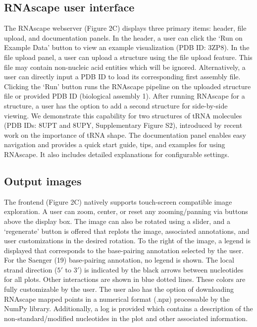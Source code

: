 \subsection{RNAscape user interface}

The RNAscape webserver (Figure 2C) displays three primary items: header, file upload, and documentation panels. In the header, a user can click the ‘Run on Example Data’ button to view an example visualization (PDB ID: 3ZP8). In the file upload panel, a user can upload a structure using the file upload feature. This file may contain non-nucleic acid entities which will be ignored. Alternatively, a user can directly input a PDB ID to load its corresponding first assembly file. Clicking the ‘Run’ button runs the RNAscape pipeline on the uploaded structure file or provided PDB ID (biological assembly 1). After running RNAscape for a structure, a user has the option to add a second structure for side-by-side viewing. We demonstrate this capability for two structures of tRNA molecules (PDB IDs: 8UPT and 8UPY, Supplementary Figure S2), introduced by recent work \citep{Krahn2024} on the importance of tRNA shape. The documentation panel enables easy navigation and provides a quick start guide, tips, and examples for using RNAscape. It also includes detailed explanations for configurable settings.

\subsection{Output images}

The frontend (Figure 2C) natively supports touch-screen compatible image exploration. A user can zoom, center, or reset any zooming/panning via buttons above the display box. The image can also be rotated using a slider, and a ‘regenerate’ button is offered that replots the image, associated annotations, and user customizations in the desired rotation. To the right of the image, a legend is displayed that corresponds to the base-pairing annotation selected by the user. For the Saenger (19) base-pairing annotation, no legend is shown. The local strand direction ($5'$ to $3'$) is indicated by the black arrows between nucleotides for all plots. Other interactions are shown in blue dotted lines. These colors are fully customizable by the user. The user also has the option of downloading RNAscape mapped points in a numerical format (.npz) processable by the NumPy \citep{harris2020array} library. Additionally, a log is provided which contains a description of the non-standard/modified nucleotides in the plot and other associated information.

